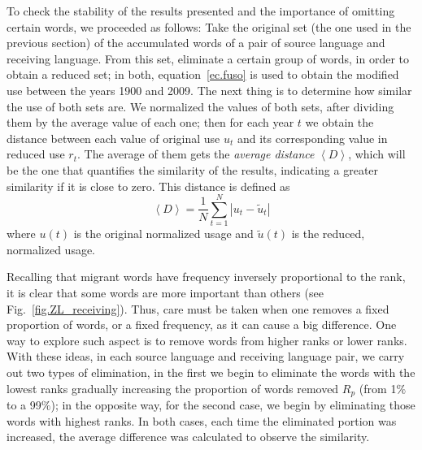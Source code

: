 \documentclass[10pt,letterpaper]{article} %
\newcommand{\fref}[1]{Fig.~\ref{#1}}
\begin{document}
To check the stability of the results presented and the importance of omitting
certain words, we proceeded as follows:  Take the original set (the one
used in the previous section) of the accumulated words of a pair of source
language and receiving language. From this set, eliminate a certain group
of words, in order to obtain a reduced set; in both,  equation~\ref{ec.fuso} is
used to obtain the modified use between the years 1900 and 2009.  The next
thing is to determine how similar the use of both sets are. We normalized the
values of both sets, after dividing them by the average value of each one; then
for each year $t$ we obtain the distance between each value of original use
$u_{t}$ and its corresponding value in reduced use $r_{t}$. The average of them
gets the \textit{average distance} $\left\langle D \right\rangle$, which will
be the one that quantifies the similarity of the results, indicating a greater
similarity if it is close to zero. This distance is defined as 
\begin{equation}
\left\langle D \right\rangle  = \frac{1}{N}\sum_{t=1}^{N} \left| u_{t} - \tilde u_{t} \right|  
\label{ec.Davg}
\end{equation}
where $u(t)$ is the original normalized usage and $\tilde u(t)$ is the reduced,
normalized usage.




Recalling that migrant words have frequency inversely proportional to the rank,
it is clear that some words are more important than others (see
\fref{fig.ZL_receiving}).  Thus, care must be taken when one removes a fixed
proportion of words, or a fixed frequency, as it can cause a big difference. 
One way to explore such aspect is to remove words from higher ranks
or lower ranks. 
With these ideas, in each source language
and receiving language pair, we carry out two types of elimination, in the
first we begin to eliminate the words with the lowest ranks gradually 
increasing the proportion of words removed $R_{p}$ (from 1$\%$ to a
99$\%$); in the opposite way, for the second case,  we begin by
eliminating those words with highest ranks. In both cases,
each time the eliminated portion was increased, the average difference was
calculated to observe the similarity.
\end{document}
